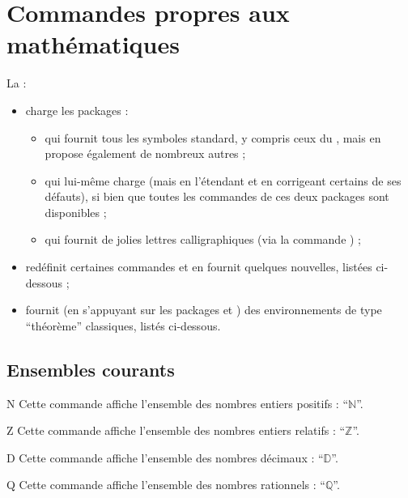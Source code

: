 \section{Commandes propres aux mathématiques}
\label{sec:comm-propr-aux}

La \nwejmauthorcl{} :
\begin{itemize}
\item charge les packages :
  \begin{itemize}
  \item {} qui fournit tous les symboles standard, y compris
    ceux du , mais en propose également de nombreux autres ;
  \item {} qui lui-même charge  (mais en
    l'étendant et en corrigeant certains de ses défauts), si bien que toutes les
    commandes de ces deux packages sont disponibles ;
  \item {} qui fournit de jolies lettres calligraphiques (via
    la commande ) ;
  \end{itemize}
\item redéfinit certaines commandes et en fournit quelques nouvelles, listées
  ci-dessous ;
\item fournit (en s'appuyant sur les packages  et
  ) des environnements de type \enquote{théorème} classiques,
  listés ci-dessous.
\end{itemize}

\subsection{Ensembles courants}

\begin{docCommand}{N}{}
  Cette commande affiche l'ensemble des nombres entiers positifs :
  \enquote{$\mathbb{N}$}.
\end{docCommand}

\begin{docCommand}{Z}{}
  Cette commande affiche l'ensemble des nombres entiers relatifs :
  \enquote{$\mathbb{Z}$}.
\end{docCommand}

\begin{docCommand}{D}{}
  Cette commande affiche l'ensemble des nombres décimaux :
  \enquote{$\mathbb{D}$}.
\end{docCommand}

\begin{docCommand}{Q}{}
  Cette commande affiche l'ensemble des nombres rationnels :
  \enquote{$\mathbb{Q}$}.
\end{docCommand}

